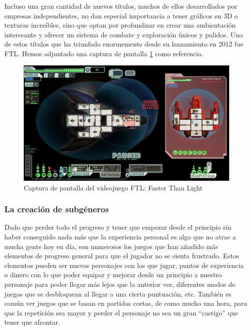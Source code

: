 Incluso una gran cantidad de nuevos títulos, muchos de ellos desarrollados por empresas independientes, no dan especial importancia a tener gráficos en 3D o texturas increíbles, sino que optan por profundizar en crear una ambientación interesante y ofrecer un sistema de combate y exploración únicos y pulidos.
Uno de estos títulos que ha triunfado enormemente desde su lanzamiento en 2012 fue FTL. Hemos adjuntado una captura de pantalla \ref{fig:ftl} como referencia.

\begin{figure}[h!]
		\includegraphics[width=\textwidth,height=\textheight,keepaspectratio]{./img/ftl.jpg}
	\caption{Captura de pantalla del videojuego FTL: Faster Than Light}
	\label{fig:ftl}
\end{figure}

\subsubsection{La creación de subgéneros}

Dado que perder todo el progreso y tener que empezar desde el principio sin haber conseguido nada más que la experiencia personal es algo que no atrae a mucha gente hoy en día, son numerosos los juegos que han añadido más elementos de progreso general para que el jugador no se sienta frustrado. Estos elementos pueden ser nuevos personajes con los que jugar, puntos de experiencia o dinero con lo que poder equipar y mejorar desde un principio a nuestro personaje para poder llegar más lejos que la anterior vez, diferentes modos de juegos que se desbloquean al llegar a una cierta puntuación, etc.
También es común ver juegos que se basan en partidas cortas, de como mucho una hora, para que la repetición sea mayor y perder el personaje no sea un gran ``castigo'' que tener que afrontar.

